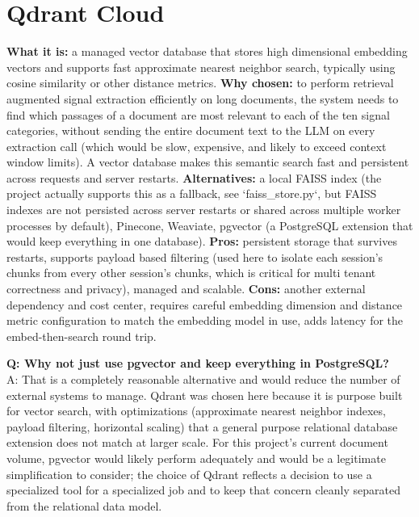 \documentclass[11pt,a4paper]{report}
\begin{document}
\section{Qdrant Cloud}
\textbf{What it is:} a managed vector database that stores high dimensional embedding vectors and supports fast approximate nearest neighbor search, typically using cosine similarity or other distance metrics.
\textbf{Why chosen:} to perform retrieval augmented signal extraction efficiently on long documents, the system needs to find which passages of a document are most relevant to each of the ten signal categories, without sending the entire document text to the LLM on every extraction call (which would be slow, expensive, and likely to exceed context window limits). A vector database makes this semantic search fast and persistent across requests and server restarts.
\textbf{Alternatives:} a local FAISS index (the project actually supports this as a fallback, see `faiss_store.py`, but FAISS indexes are not persisted across server restarts or shared across multiple worker processes by default), Pinecone, Weaviate, pgvector (a PostgreSQL extension that would keep everything in one database).
\textbf{Pros:} persistent storage that survives restarts, supports payload based filtering (used here to isolate each session's chunks from every other session's chunks, which is critical for multi tenant correctness and privacy), managed and scalable.
\textbf{Cons:} another external dependency and cost center, requires careful embedding dimension and distance metric configuration to match the embedding model in use, adds latency for the embed-then-search round trip.

\begin{qabox}
\textbf{Q: Why not just use pgvector and keep everything in PostgreSQL?} \\
A: That is a completely reasonable alternative and would reduce the number of external systems to manage. Qdrant was chosen here because it is purpose built for vector search, with optimizations (approximate nearest neighbor indexes, payload filtering, horizontal scaling) that a general purpose relational database extension does not match at larger scale. For this project's current document volume, pgvector would likely perform adequately and would be a legitimate simplification to consider; the choice of Qdrant reflects a decision to use a specialized tool for a specialized job and to keep that concern cleanly separated from the relational data model.
\end{qabox}
\end{document}
